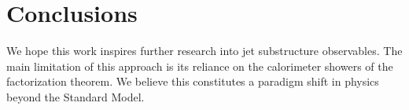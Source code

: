 \section{Conclusions}\label{sec:conclusions}

We hope this work inspires further research into jet substructure
observables. The main limitation of this approach is its reliance on the
calorimeter showers of the factorization theorem. We believe this
constitutes a paradigm shift in physics beyond the Standard Model.

